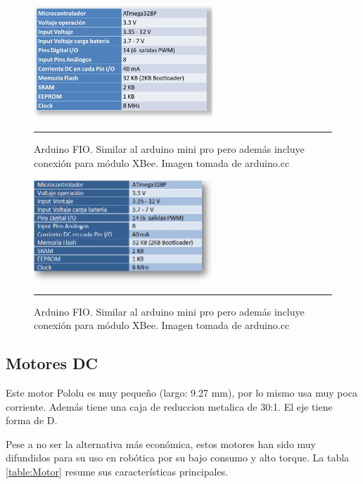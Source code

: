 \begin{figure}[htbp]
	\centering
		\includegraphics[width=0.6\textwidth]{./Figures/MODI/fio.png}
		\rule{35em}{0.5pt}
	\caption[fio]{Arduino FIO. Similar al arduino mini pro pero además incluye conexión para módulo XBee. Imagen tomada de arduino.cc}
	\label{fig:fio1}
\end{figure}

\begin{figure}[htbp]
	\centering
		\includegraphics[width=0.6\textwidth]{./Figures/MODI/fio2.png}
		\rule{35em}{0.5pt}
	\caption[fio]{Arduino FIO. Similar al arduino mini pro pero además incluye conexión para módulo XBee. Imagen tomada de arduino.cc}
	\label{fig:fio2}
\end{figure}

\subsection{Motores DC}

Este motor Pololu es muy pequeño (largo: 9.27 mm), por lo mismo usa muy poca corriente. Además tiene una caja de reduccion metalica de 30:1. El eje tiene forma de D.

Pese a no ser la alternativa más económica, estos motores han sido muy difundidos para su uso en robótica por su bajo consumo y alto torque. La tabla \ref{table:Motor} resume sus características principales.

